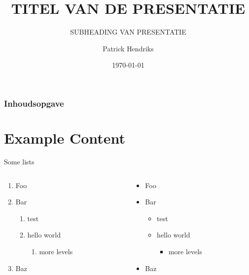 \documentclass[pdf]{beamer}
\author{Patrick Hendriks}
\title{TITEL VAN DE PRESENTATIE}
\subtitle{SUBHEADING VAN PRESENTATIE}
\institute{Hogeschool van Amsterdam}
\date{\today}
\begin{document}
\frame{\titlepage}

\begin{frame}
	\frametitle{Inhoudsopgave}
	\tableofcontents
\end{frame}


\section{Example Content}

\begin{frame}{\insertsectionhead}{Some lists}
	\begin{columns}
		\begin{column}{0.5\textwidth}
			\begin{enumerate}
				\item Foo
				\item Bar
				\begin{enumerate}
					\item test
					\item hello world
					\begin{enumerate}
						\item more levels
					\end{enumerate}
				\end{enumerate}
				\item Baz
			\end{enumerate}
		\end{column}
		\begin{column}{0.5\textwidth}
			\begin{itemize}
				\item Foo
				\item Bar
				\begin{itemize}
					\item test
					\item hello world
					\begin{itemize}
						\item more levels
					\end{itemize}
				\end{itemize}
				\item Baz
			\end{itemize}
		\end{column}
	\end{columns}
\end{frame}
\end{document}
